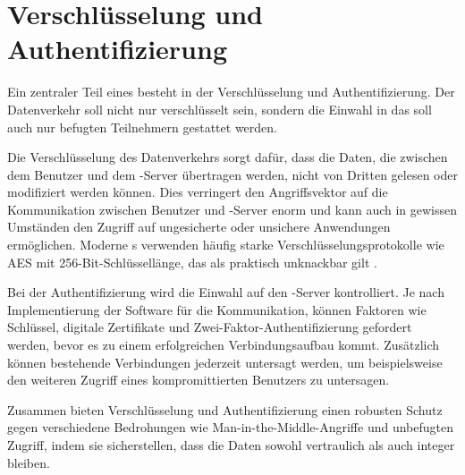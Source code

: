 \section{Verschlüsselung und Authentifizierung}

Ein zentraler Teil eines  besteht in der Verschlüsselung und Authentifizierung. Der Datenverkehr soll nicht nur verschlüsselt sein, sondern die Einwahl in das  soll auch nur befugten Teilnehmern gestattet werden.

Die Verschlüsselung des Datenverkehrs sorgt dafür, dass die Daten, die zwischen dem Benutzer und dem -Server übertragen werden, nicht von Dritten gelesen oder modifiziert werden können. Dies verringert den Angriffsvektor auf die Kommunikation zwischen Benutzer und -Server enorm und kann auch in gewissen Umständen den Zugriff auf ungesicherte oder unsichere Anwendungen ermöglichen. Moderne s verwenden häufig starke Verschlüsselungsprotokolle wie \gls{AES} mit 256-Bit-Schlüssellänge, das als praktisch unknackbar gilt \cite{BSI_Recommendations_and_key_lengths}.

Bei der Authentifizierung wird die Einwahl auf den -Server kontrolliert. Je nach Implementierung der Software für die Kommunikation, können Faktoren wie Schlüssel, digitale Zertifikate und Zwei-Faktor-Authentifizierung gefordert werden, bevor es zu einem erfolgreichen Verbindungsaufbau kommt. Zusätzlich können bestehende Verbindungen jederzeit untersagt werden, um beispielsweise den weiteren Zugriff eines kompromittierten Benutzers zu untersagen. 

Zusammen bieten Verschlüsselung und Authentifizierung einen robusten Schutz gegen verschiedene Bedrohungen wie Man-in-the-Middle-Angriffe und unbefugten Zugriff, indem sie sicherstellen, dass die Daten sowohl vertraulich als auch integer bleiben.